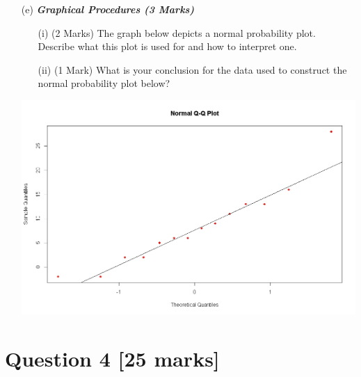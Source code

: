 \documentclass[a4paper,12pt]{article}
\begin{document}
\begin{itemize}
\begin{itemize}
\item[(e)] \textbf{\textit{Graphical Procedures (3 Marks)}}
\begin{itemize}
\item[(i)] (2 Marks) The graph below depicts a normal probability plot. Describe what this plot is used for and how to interpret one.
\item[(ii)](1 Mark) What is your conclusion for the data used to construct the normal probability plot below?
\end{itemize}
\begin{center}
\includegraphics[scale=0.38]{10AQQplot}
\end{center}
\end{itemize}






\newpage
\section*{Question 4 [25 marks]}


\end{itemize}
\end{document}
